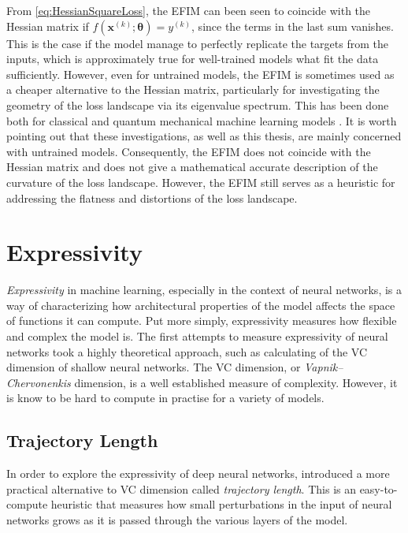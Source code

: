 From \autoref{eq:HessianSquareLoss}, the EFIM can been seen to coincide with the Hessian matrix if $f(\boldsymbol{x}^{(k)};\boldsymbol{\theta}) = y^{(k)}$, since the terms in the last sum vanishes. This is the case if the model manage to perfectly replicate the targets from the inputs, which is approximately true for well-trained models what fit the data sufficiently. However, even for untrained models, the EFIM is sometimes used as a cheaper alternative to the Hessian matrix, particularly for investigating the geometry of the loss landscape via its eigenvalue spectrum. This has been done both for classical and quantum mechanical machine learning models \cite{karakida2019universal} \cite{abbas2020power}. It is worth pointing out that these investigations, as well as this thesis, are mainly concerned with untrained models. Consequently, the EFIM does not coincide with the Hessian matrix and does not give a mathematical accurate description of the curvature of the loss landscape. However, the EFIM still serves as a heuristic for addressing the flatness and distortions of the loss landscape. 

\section{Expressivity}\label{sec:Expressivity}
\emph{Expressivity} in machine learning, especially in the context of neural networks, is a way of characterizing how architectural properties of the model affects the space of functions it can compute. Put more simply, expressivity measures how flexible and complex the model is. The first attempts to measure expressivity of neural networks took a highly theoretical approach, such as \citet{Bartlett} calculating of the VC dimension of shallow neural networks. The VC dimension, or \emph{Vapnik–Chervonenkis} dimension\cite{hastie01statisticallearning}, is a well established measure of complexity. However, it is know to be hard to compute in practise for a variety of models\cite{abbas2020power}.  

\subsection{Trajectory Length}\label{sec:TrajectoryLength}
In order to explore the expressivity of deep neural networks, \citet{raghu2017expressive} introduced a more practical alternative to VC dimension called \emph{trajectory length}. This is an easy-to-compute heuristic that measures how small perturbations in the input of neural networks grows as it is passed through the various layers of the model. 

